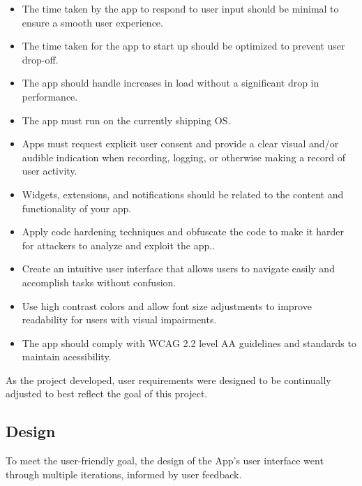 \begin{itemize}
  \item The time taken by the app to respond to user input should be minimal
  to ensure a smooth user experience\cite{Tundwal2025}.
  \item The time taken for the app to start up should be optimized to prevent
  user drop-off\cite{Tundwal2025}.
  \item The app should handle increases in load without a
  significant drop in performance\cite{Tundwal2025}.
  \item The app must run on the currently shipping OS\cite{Apple2025}.
  \item Apps must request explicit user consent and provide a clear visual
  and/or audible indication when recording, logging, or otherwise making a
  record of user activity\cite{Apple2025}.
  \item Widgets, extensions, and notifications should be related to the
  content and functionality of your app\cite{Apple2025}.
  \item Apply code hardening techniques and obfuscate the code to make it
  harder for attackers to analyze and exploit the app.\cite{Tundwal2025}.
  \item Create an intuitive user interface that allows users to navigate easily and accomplish tasks without confusion\cite{Tundwal2025}.
  \item Use high contrast colors and allow font size adjustments to improve readability for users with visual impairments\cite{Tundwal2025}.
  \item The app should comply with WCAG 2.2 level AA guidelines and standards to maintain acessibility\cite{GovUK_WCAG}.
\end{itemize}

As the project developed, user requirements were designed to be continually adjusted to best reflect the goal of this project.


\subsection{Design}
To meet the user-friendly goal, the design of the App's user interface went through multiple iterations, informed by user feedback.

